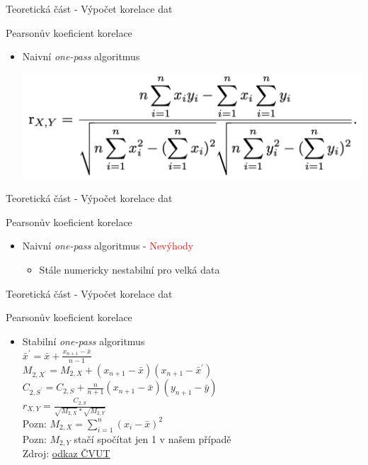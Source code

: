 \documentclass[aspectratio=169, xcolor=dvipsnames]{beamer}
\begin{document}
\begin{frame}{Teoretická část - Výpočet korelace dat}
  \begin{block}{Pearsonův koeficient korelace}
    \begin{itemize}
      \item Naivní \textit{one-pass} algoritmus
        \begin{center}
          \includegraphics[width=\linewidth]{assets/pearson-onepass-naive.png} 
        \end{center}
     \end{itemize} 
  \end{block} 
\end{frame}

\begin{frame}{Teoretická část - Výpočet korelace dat}
  \begin{block}{Pearsonův koeficient korelace}
    \begin{itemize}
      \item Naivní \textit{one-pass} algoritmus - \textcolor{Red}{Nevýhody}
        \begin{itemize}
          \item Stále numericky nestabilní pro velká data
        \end{itemize}
     \end{itemize} 
  \end{block} 
\end{frame}

\begin{frame}{Teoretická část - Výpočet korelace dat}
  \begin{block}{Pearsonův koeficient korelace}
    \begin{itemize}
      \item Stabilní \textit{one-pass} algoritmus  \\
        $ \bar{x}^{'} = \bar{x} + \frac{x_{n+1} - \bar{x}}{n - 1}$ \\
        $ M_{2, X^{'}} = M_{2, X} + (x_{n+1} - \bar{x})(x_{n+1} - \bar{x}^{'})$ \\
        $ C_{2, S^{'}} = C_{2, S} + \frac{n}{n+1} {(x_{n+1} - \bar{x})(y_{n+1} - \bar{y})}$ \\
        $ r_{X, Y} = \frac{C_{2, S}}{\sqrt{M_{2, X}}* \sqrt{M_{2, Y}}}$ \\
        Pozn: $ M_{2, X} = \sum_{i=1}^{n}{(x_i - \bar{x})}^2$ \\
        Pozn: $ M_{2, Y}$ stačí spočítat jen 1 v našem případě\\
        Zdroj: \href{https://crypto.fit.cvut.cz/sites/default/files/publications/fulltexts/pearson.pdf}{\underline{odkaz ČVUT}}
     \end{itemize} 
  \end{block} 
\end{frame}
\end{document}
